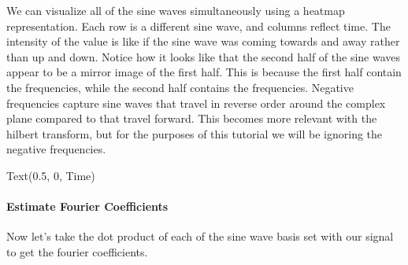 \documentclass[letterpaper,10pt,english]{sphinxmanual}
\begin{document}
\noindent{}

We can visualize all of the sine waves simultaneously using a heatmap representation.  Each row is a different sine wave, and columns reflect time.  The intensity of the value is like if the sine wave was coming towards and away rather than up and down. Notice how it looks like that the second half of the sine waves appear to be a mirror image of the first half.  This is because the first half contain the  frequencies, while the second half contains the  frequencies.  Negative frequencies capture sine waves that travel in reverse order around the complex plane compared to that travel forward. This becomes more relevant with the hilbert transform, but for the purposes of this tutorial we will be ignoring the negative frequencies.

\begin{sphinxVerbatim}[commandchars=\\\{\}]
   
 
 
\end{sphinxVerbatim}

\begin{sphinxVerbatim}[commandchars=\\\{\}]
Text(0.5, 0, \PYGZsq{}Time\PYGZsq{})
\end{sphinxVerbatim}

\noindent{}


\paragraph{Estimate Fourier Coefficients}
\label{\detokenize{content/Signal_Processing:estimate-fourier-coefficients}}
Now let’s take the dot product of each of the sine wave basis set with our signal to get the fourier coefficients.
\end{document}
